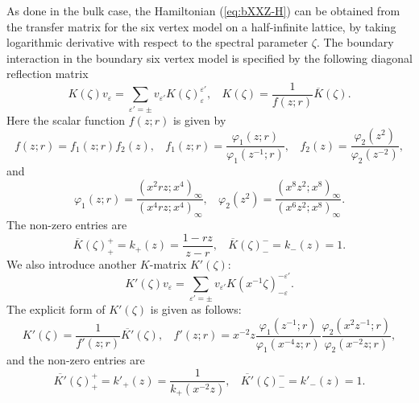 \documentclass[a4paper,10pt]{article}
\begin{document}
{As done in 
the bulk case, the Hamiltonian (\ref{eq:bXXZ-H}) 
can be obtained from the transfer matrix for the 
six vertex model on a half-infinite lattice, by taking 
logarithmic derivative with respect to the spectral 
parameter $\zeta$. The boundary interaction in the 
boundary six vertex model is specified by the following 
diagonal reflection matrix \cite{RE,Skl}
\begin{equation}
K(\zeta )v_\varepsilon =\sum_{\varepsilon'=\pm} 
v_{\varepsilon'} K(\zeta )^{\varepsilon'}_\varepsilon , 
~~~~
K(\zeta )=\frac{1}{f(z;r)}\overline{K}(\zeta ). 
\label{eq:K-mat}
\end{equation}
Here the scalar function $f(z;r)$ is given by 
$$
f(z;r)=f_1 (z;r)f_2 (z), ~~~~
f_1 (z;r)=\frac{\varphi_1 (z; r)}{\varphi_1 (z^{-1}; r)}, 
~~~~ f_2 (z)=\frac{\varphi_2 (z^2 )}{\varphi_2 (z^{-2})}, 
$$
and 
\begin{equation}
\varphi_1 (z; r)=\frac{(x^2 rz;x^4)_{\infty}}
{(x^4 rz;x^4)_{\infty}}, ~~~~
\varphi_2 (z^2 )=\frac{(x^8 z^{2};x^8)_{\infty}}
{(x^6 z^2 ;x^8)_{\infty}}. 
\label{eq:varphi}
\end{equation}
The non-zero entries are 
\begin{equation}
\overline{K}(\zeta )^+_+ =k_+ (z)=
\frac{1-rz}{z-r}, ~~~~
\overline{K}(\zeta )^-_- =k_- (z)=1. 
\label{eq:K-comp}
\end{equation}
We also introduce another $K$-matrix $K' (\zeta )$: 
$$
K' (\zeta )v_\varepsilon =
\sum_{\varepsilon'=\pm} v_{\varepsilon'} 
K(x^{-1}\zeta )^{-\varepsilon'}_{-\varepsilon}. 
$$
The explicit form of $K' (\zeta )$ is given as 
follows: 
\begin{equation}
K' (\zeta )=\frac{1}{f'(z;r)}\overline{K'}(\zeta ), 
~~~~
f'(z;r)=x^{-2}z
\frac{\varphi_1 (z^{-1}; r)}{\varphi_1 (x^{-4}z; r)}
\frac{\varphi_2 (x^2 z^{-1}; r)}{\varphi_2 (x^{-2}z; r)}, 
\label{eq:K*-mat}
\end{equation}
and the non-zero entries are 
\begin{equation}
\overline{K'}(\zeta )^+_+ =k'_+ (z)=
\frac{1}{k_+ (x^{-2}z)}, ~~~~
\overline{K'}(\zeta )^-_- =k'_- (z)=1. 
\label{eq:K*-comp}
\end{equation}

}
\end{document}
